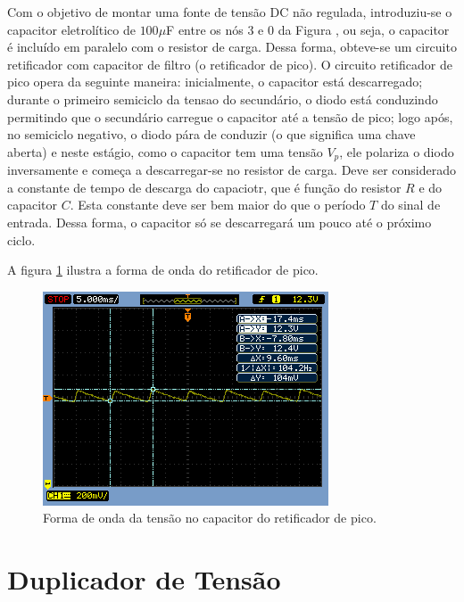 \documentclass[a4paper]{article} %
\renewcommand{\thefigure}{\thesection.\arabic{figure}}
\begin{document}
\newpage
    Com o objetivo de montar uma fonte de tensão DC não regulada, introduziu-se o capacitor eletrolítico de  $100\mu$F entre os nós 3 e 0 da Figura \label{fig:ret-circ2}, ou seja, o capacitor é incluído em paralelo com o resistor de carga. Dessa forma, obteve-se um circuito retificador com capacitor de filtro (o retificador de pico).
         O circuito retificador de pico opera da seguinte maneira: inicialmente, o capacitor está descarregado; durante o primeiro semiciclo da tensao do secundário, o diodo está conduzindo permitindo que o secundário carregue o capacitor até a tensão de pico; logo após, no semiciclo negativo, o diodo pára de conduzir (o que significa uma chave aberta) e neste estágio, como o capacitor tem uma tensão $V_p$, ele polariza o diodo inversamente e começa a descarregar-se no resistor de carga. Deve ser considerado a constante de tempo de descarga do capaciotr, que é função do resistor $R$ e do capacitor $C$. Esta constante deve ser bem maior do que o período $T$ do sinal de entrada. Dessa forma, o capacitor só se descarregará um pouco até o próximo ciclo.

A figura \ref{fig:cap-ret} ilustra a forma de onda do retificador de pico.

\begin{figure}[h!]
\begin{centering}
\includegraphics[scale=0.7]{Imagens/3.3.4capacitor_paralelo/3cap} \caption{Forma de onda da tensão no capacitor do retificador de pico. \label{fig:cap-ret}}
\par\end{centering}
\end{figure}

\newpage

\renewcommand{\thefigure}{\thesection.\arabic{figure}}

\section{Duplicador de Tensão}
\end{document}
